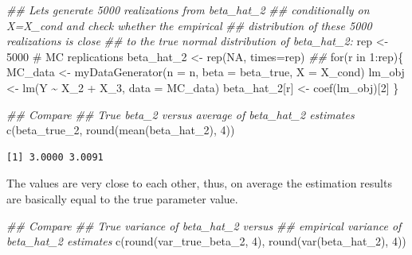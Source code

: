 \documentclass[
  letterpaper,
  DIV=11,
  numbers=noendperiod]{scrreprt}
\newenvironment{Shaded}{\begin{snugshade}}{\end{snugshade}}
\newcommand{\AttributeTok}[1]{\textcolor[rgb]{0.40,0.45,0.13}{#1}}
\newcommand{\CommentTok}[1]{\textcolor[rgb]{0.37,0.37,0.37}{#1}}
\newcommand{\ConstantTok}[1]{\textcolor[rgb]{0.56,0.35,0.01}{#1}}
\newcommand{\ControlFlowTok}[1]{\textcolor[rgb]{0.00,0.23,0.31}{#1}}
\newcommand{\DecValTok}[1]{\textcolor[rgb]{0.68,0.00,0.00}{#1}}
\newcommand{\DocumentationTok}[1]{\textcolor[rgb]{0.37,0.37,0.37}{\textit{#1}}}
\newcommand{\FunctionTok}[1]{\textcolor[rgb]{0.28,0.35,0.67}{#1}}
\newcommand{\NormalTok}[1]{\textcolor[rgb]{0.00,0.23,0.31}{#1}}
\newcommand{\OtherTok}[1]{\textcolor[rgb]{0.00,0.23,0.31}{#1}}
\newcommand{\SpecialCharTok}[1]{\textcolor[rgb]{0.37,0.37,0.37}{#1}}
\theoremstyle{definition}
\theoremstyle{plain}
\theoremstyle{plain}
\theoremstyle{remark}
\begin{document}
\begin{Shaded}
\begin{Highlighting}[]
\DocumentationTok{\#\# Let\textquotesingle{}s generate 5000 realizations from beta\_hat\_2 }
\DocumentationTok{\#\# conditionally on X=X\_cond and check whether the empirical  }
\DocumentationTok{\#\# distribution of these 5000 realizations is close }
\DocumentationTok{\#\# to the true normal distribution of beta\_hat\_2:}
\NormalTok{rep        }\OtherTok{\textless{}{-}} \DecValTok{5000} \CommentTok{\# MC replications}
\NormalTok{beta\_hat\_2 }\OtherTok{\textless{}{-}} \FunctionTok{rep}\NormalTok{(}\ConstantTok{NA}\NormalTok{, }\AttributeTok{times=}\NormalTok{rep)}
\DocumentationTok{\#\#}
\ControlFlowTok{for}\NormalTok{(r }\ControlFlowTok{in} \DecValTok{1}\SpecialCharTok{:}\NormalTok{rep)\{}
\NormalTok{    MC\_data }\OtherTok{\textless{}{-}} \FunctionTok{myDataGenerator}\NormalTok{(}\AttributeTok{n    =}\NormalTok{ n, }
                               \AttributeTok{beta =}\NormalTok{ beta\_true, }
                               \AttributeTok{X    =}\NormalTok{ X\_cond)}
\NormalTok{    lm\_obj        }\OtherTok{\textless{}{-}} \FunctionTok{lm}\NormalTok{(Y }\SpecialCharTok{\textasciitilde{}}\NormalTok{ X\_2 }\SpecialCharTok{+}\NormalTok{ X\_3, }\AttributeTok{data =}\NormalTok{ MC\_data)}
\NormalTok{    beta\_hat\_2[r] }\OtherTok{\textless{}{-}} \FunctionTok{coef}\NormalTok{(lm\_obj)[}\DecValTok{2}\NormalTok{]}
\NormalTok{\}}

\DocumentationTok{\#\# Compare}
\DocumentationTok{\#\# True beta\_2 versus average of beta\_hat\_2 estimates}
\FunctionTok{c}\NormalTok{(beta\_true\_2, }\FunctionTok{round}\NormalTok{(}\FunctionTok{mean}\NormalTok{(beta\_hat\_2), }\DecValTok{4}\NormalTok{))}
\end{Highlighting}
\end{Shaded}

\begin{verbatim}
[1] 3.0000 3.0091
\end{verbatim}

The values are very close to each other, thus, on average the estimation
results are basically equal to the true parameter value.

\begin{Shaded}
\begin{Highlighting}[]
\DocumentationTok{\#\# Compare}
\DocumentationTok{\#\# True variance of beta\_hat\_2 versus }
\DocumentationTok{\#\# empirical variance of beta\_hat\_2 estimates}
\FunctionTok{c}\NormalTok{(}\FunctionTok{round}\NormalTok{(var\_true\_beta\_2, }\DecValTok{4}\NormalTok{), }\FunctionTok{round}\NormalTok{(}\FunctionTok{var}\NormalTok{(beta\_hat\_2), }\DecValTok{4}\NormalTok{))}
\end{Highlighting}
\end{Shaded}
\end{document}

